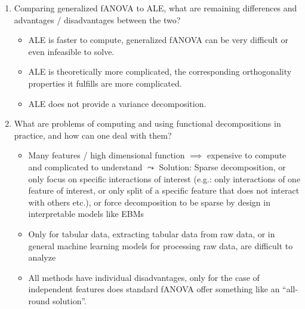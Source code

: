 \begin{enumerate}
    \item
    Comparing generalized fANOVA to ALE, what are remaining differences and advantages / disadvantages between the two?
    \begin{itemize}
        \item ALE is faster to compute, generalized fANOVA can be very difficult or even infeasible to solve.
        \item ALE is theoretically more complicated, the corresponding orthogonality properties it fulfills are more complicated.
        \item ALE does not provide a variance decomposition.
    \end{itemize}

    \item
    What are problems of computing and using functional decompositions in practice, and how can one deal with them?
    
    \begin{itemize}
    
        \item 
        Many features / high dimensional function $\implies$ expensive to compute and complicated to understand $\leadsto$ Solution: Sparse decomposition, or only focus on specific interactions of interest (e.g.: only interactions of one feature of interest, or only split of a specific feature that does not interact with others etc.), or force decomposition to be sparse by design in interpretable models like EBMs
        \item 
        Only for tabular data, extracting tabular data from raw data, or in general machine learning models for processing raw data, are difficult to analyze
        \item 
        All methods have individual disadvantages, only for the case of independent features does standard fANOVA offer something like an ``all-round solution''.
        
    \end{itemize}
    
\end{enumerate}